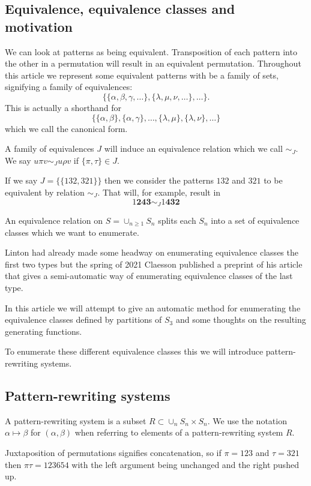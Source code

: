 \documentclass[openany, a4paper, 11pt, english]{article}
\newcommand{\patternrule}{ \mapsto \!}
\theoremstyle{definition}
\newcommand{\Sym}{S}
\begin{document}
\subsection{Equivalence, equivalence classes and motivation}
We can look at patterns as being equivalent. Transposition of each pattern into
the other in a permutation will result in an equivalent permutation. Throughout
this article we represent some equivalent patterns with be a family of sets, signifying
a family of equivalences:
\[
    \{ \{\alpha, \beta, \gamma, \dots \}, \{\lambda, \mu, \nu, \dots \}, \dots
    \}.
\]
This is actually a shorthand for
\[
    \{ \{ \alpha, \beta \}, \{ \alpha, \gamma \}, \dots, \{ \lambda, \mu \}, \{
        \lambda, \nu \}, \dots \}
\]
which we call the canonical form.

A family of equivalences $J$ will induce an equivalence relation which we call $\sim_J$. We
say $u \pi v \sim_J u \rho v$ if $\{ \pi, \tau \} \in J$.

If we say $J = \{ \{ 132, 321 \} \}$ then we consider the patterns $132$ and $321$ to
be equivalent by relation $\sim_J$. That will, for example, result in
\[
    1\bm{243} \sim_J 1\bm{432}
\]

An equivalence relation on $\Sym = \cup_{n \geq 1} \Sym_n$ splits each $\Sym_n$
into a set of equivalence classes which we want to enumerate. 

Linton had already made some headway on enumerating equivalence classes the
first two types but the spring of 2021 Claesson published a preprint of his
article that gives a semi-automatic way of enumerating equivalence classes of
the last type.

In this article we will attempt to give an automatic method for enumerating the
equivalence classes defined by partitions of $\Sym_3$ and some thoughts on the
resulting generating functions.

To enumerate these different equivalence classes this we will introduce
pattern-rewriting systems.

\subsection{Pattern-rewriting systems}
A pattern-rewriting system is a subset $R \subset \cup_{n} \Sym_n \times \Sym_n$.
We use the notation $\alpha \patternrule \beta$ for $(\alpha, \beta)$ when referring
to elements of a pattern-rewriting system $R$. 

Juxtaposition of permutations signifies concatenation, so if $\pi=123$ and
$\tau=321$ then $\pi\tau=123654$ with the left argument being unchanged and the
right pushed up.
\end{document}
